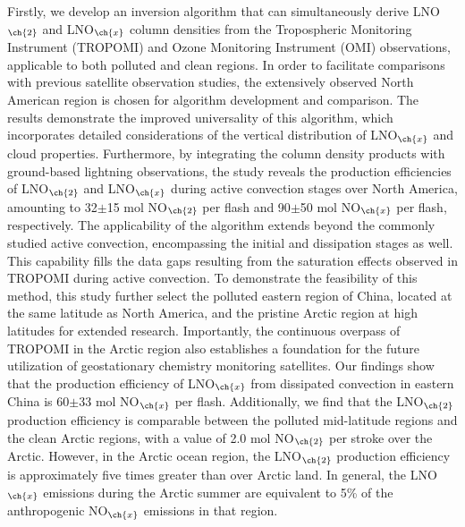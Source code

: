 {Firstly, we develop an inversion algorithm that can simultaneously derive LNO$_{\ch{2}}$ and LNO$_{\ch{x}}$ column densities from the Tropospheric Monitoring Instrument (TROPOMI) and Ozone Monitoring Instrument (OMI) observations, applicable to both polluted and clean regions.
In order to facilitate comparisons with previous satellite observation studies, the extensively observed North American region is chosen for algorithm development and comparison.
The results demonstrate the improved universality of this algorithm, which incorporates detailed considerations of the vertical distribution of LNO$_{\ch{x}}$ and cloud properties.
Furthermore, by integrating the column density products with ground-based lightning observations, the study reveals the production efficiencies of LNO$_{\ch{2}}$ and LNO$_{\ch{x}}$ during active convection stages over North America, amounting to 32$\pm$15 mol NO$_{\ch{2}}$ per flash and 90$\pm$50 mol NO$_{\ch{x}}$ per flash, respectively.
The applicability of the algorithm extends beyond the commonly studied active convection, encompassing the initial and dissipation stages as well.
This capability fills the data gaps resulting from the saturation effects observed in TROPOMI during active convection.
To demonstrate the feasibility of this method, this study further select the polluted eastern region of China, located at the same latitude as North America, and the pristine Arctic region at high latitudes for extended research.
Importantly, the continuous overpass of TROPOMI in the Arctic region also establishes a foundation for the future utilization of geostationary chemistry monitoring satellites.
Our findings show that the production efficiency of LNO$_{\ch{x}}$ from dissipated convection in eastern China is 60$\pm$33 mol NO$_{\ch{x}}$ per flash.
Additionally, we find that the LNO$_{\ch{2}}$ production efficiency is comparable between the polluted mid-latitude regions and the clean Arctic regions, with a value of 2.0 mol NO$_{\ch{2}}$ per stroke over the Arctic.
However, in the Arctic ocean region, the LNO$_{\ch{2}}$ production efficiency is approximately five times greater than over Arctic land.
In general, the LNO$_{\ch{x}}$ emissions during the Arctic summer are equivalent to 5\% of the anthropogenic NO$_{\ch{x}}$ emissions in that region.

}
